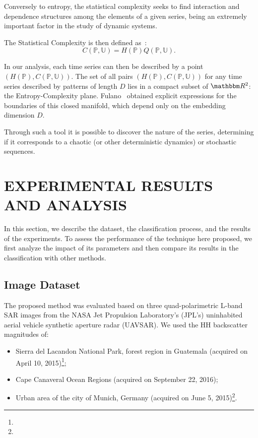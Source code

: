 \documentclass[journal]{IEEEtran}
\begin{document}
Conversely to entropy, the statistical complexity seeks to find interaction and dependence structures among the elements of a given series, being an extremely important factor in the study of dynamic systems.

The Statistical Complexity is then defined as~\cite{Lamberti2004}:
\begin{equation}
	C(\mathbb{P}, \mathbb{U}) = H(\mathbb{P}) Q(\mathbb{P}, \mathbb{U}).
\end{equation}

In our analysis, each time series can then be described by a point $(H(\mathbb{P}), C(\mathbb{P}, \mathbb{U}))$.
The set of all pairs $(H(\mathbb{P}), C(\mathbb{P}, \mathbb{U}))$ for any time series described by patterns of length $D$ lies in a compact subset of $\mathbbm R^2$: the Entropy-Complexity plane.
Fulano~\cite{Fulano:Cotas} obtained explicit expressions for the boundaries of this closed manifold, which depend only on the embedding dimension $D$.

Through such a tool it is possible to discover the nature of the series, determining if it corresponds to a chaotic (or other deterministic dynamics) or stochastic sequences.

\section{EXPERIMENTAL RESULTS AND ANALYSIS}\label{Results}

In this section, we describe the dataset, 
the classification process, and 
the results of the experiments.
To assess the performance of the technique here proposed, we first analyze the impact of its parameters and then compare its results in the classification with other methods.

\subsection{Image Dataset}

The proposed method was evaluated based on three quad-polarimetric L-band SAR images from the NASA Jet Propulsion Laboratory’s (JPL’s) uninhabited aerial vehicle synthetic aperture radar (UAVSAR).
We used the HH backscatter magnitudes of:
\begin{itemize}
	\item Sierra del Lacandon National Park, forest region in Guatemala (acquired on April 10, 2015)\footnote{};
	\item Cape Canaveral Ocean Regions (acquired on September 22, 2016);
	\item Urban area of the city of Munich, Germany (acquired on June 5, 2015)\footnote{}.
\end{itemize}
\end{document}
